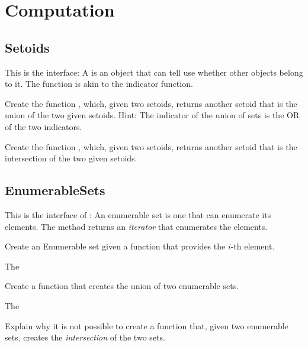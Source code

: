 

\chapter{Computation}


\section{Setoids}

This is the \Setoid interface:
%
%
A \Setoid is an object that can tell use whether other objects belong to it.
The  function is akin to the indicator function.


\begin{exercise}
Create the function , which, given two setoids, returns another setoid that is the union of the two given setoids.
%
%
Hint: The indicator of the union of sets is the OR of the two indicators.
\end{exercise}

\begin{exercise}
Create the function , which, given two setoids, returns another setoid that is the intersection of the two given setoids.
%
\end{exercise}


\section{EnumerableSets}

This is the interface of :
%
%
An enumerable set is one that can enumerate its elements.
The method  returns an \emph{iterator} that enumerates the elements.

\begin{exercise}
Create an Enumerable set given a function that provides the $i$-th element.

The
%
\end{exercise}

\begin{exercise}
Create a function that creates the union of two enumerable sets.

The
%
\end{exercise}

\begin{exercise}
Explain why it is not possible to create a function that, given two enumerable sets,
creates the \emph{intersection} of the two sets.
\end{exercise}


